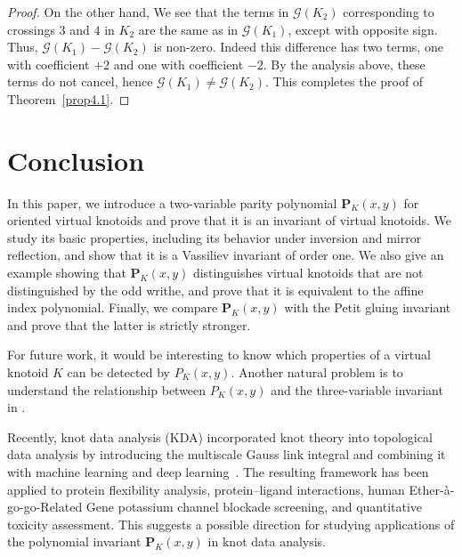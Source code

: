 \documentclass[12pt]{amsart}
\theoremstyle{noparens}
\numberwithin{equation}{section}
\numberwithin{equation}{section}
\begin{document}
\begin{proof}
	On the other hand, We see that the terms in $\mathcal{G}(K_2)$ corresponding to crossings $3$ and $4$ in $K_2$ are the same as in $\mathcal{G}(K_1)$, except with opposite sign. Thus, $\mathcal{G}(K_1)-\mathcal{G}(K_2)$ is non-zero. Indeed this difference has two terms, one with coefficient $+2$ and one with coefficient $-2$. By the analysis above, these terms do not cancel, hence $\mathcal{G}(K_1) \neq \mathcal{G}(K_2)$. This completes the proof of Theorem~\ref{prop4.1}. 
\end{proof}

\section{Conclusion}

In this paper, we introduce a two-variable parity polynomial $\mathbf{P}_K(x,y)$ for oriented virtual knotoids and prove that it is an invariant of virtual knotoids. We study its basic properties, including its behavior under inversion and mirror reflection, and show that it is a Vassiliev invariant of order one. We also give an example showing that $\mathbf{P}_K(x,y)$ distinguishes virtual knotoids that are not distinguished by the odd writhe, and prove that it is equivalent to the affine index polynomial. Finally, we compare $\mathbf{P}_K(x,y)$ with the Petit gluing invariant and prove that the latter is strictly stronger.

For future work, it would be interesting to know which properties of a virtual knotoid $K$ can be detected by $P_K(x,y)$. Another natural problem is to understand the relationship between $P_K(x,y)$ and the three-variable invariant in \cite{FLV}.

Recently, knot data analysis (KDA) incorporated knot theory into topological data analysis by introducing the multiscale Gauss link integral and combining it with machine learning and deep learning~\cite{KDA}. The resulting framework has been applied to protein flexibility analysis, protein--ligand interactions, human Ether-à-go-go-Related Gene potassium channel blockade screening, and quantitative toxicity assessment. This suggests a possible direction for studying applications of the polynomial invariant $\mathbf{P}_K(x,y)$ in knot data analysis.
\end{document}
